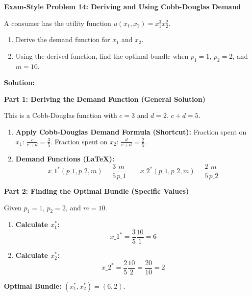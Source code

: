 \documentclass{article}
\begin{document}
\vspace{0.5em}

\vspace{0.5em}

\noindent\textbf{Exam-Style Problem 14: Deriving and Using Cobb-Douglas Demand}
\vspace{0.5em}

\noindent A consumer has the utility function $u(x_1, x_2) = x_1^3 x_2^2$.
\begin{enumerate}
    \item Derive the demand function for $x_1$ and $x_2$.
    \item Using the derived function, find the optimal bundle when $p_1=1$, $p_2=2$, and $m=10$.
\end{enumerate}

\vspace{1em}
\noindent\textbf{Solution:}
\vspace{0.5em}

\noindent\textbf{Part 1: Deriving the Demand Function (General Solution)}
\vspace{0.5em}

\noindent This is a Cobb-Douglas function with $c=3$ and $d=2$. $c+d = 5$.
\begin{enumerate}
    \item \textbf{Apply Cobb-Douglas Demand Formula (Shortcut):} Fraction spent on $x_1$: $\frac{c}{c+d} = \frac{3}{5}$. Fraction spent on $x_2$: $\frac{d}{c+d} = \frac{2}{5}$.
    \item \textbf{Demand Functions (LaTeX):} \[ x\_1^*(p\_1, p\_2, m) = \frac{3}{5} \frac{m}{p\_1} \qquad x\_2^*(p\_1, p\_2, m) = \frac{2}{5} \frac{m}{p\_2} \]
\end{enumerate}

\vspace{0.5em}
\noindent\textbf{Part 2: Finding the Optimal Bundle (Specific Values)}
\vspace{0.5em}

\noindent Given $p_1=1$, $p_2=2$, and $m=10$.
\begin{enumerate}
    \item \textbf{Calculate $x_1^*$:} \[ x\_1^* = \frac{3}{5} \frac{10}{1} = 6 \]
    \item \textbf{Calculate $x_2^*$:} \[ x\_2^* = \frac{2}{5} \frac{10}{2} = \frac{20}{10} = 2 \]
\end{enumerate}

\noindent\textbf{Optimal Bundle:} $(x_1^*, x_2^*) = (6, 2)$.
\end{document}
